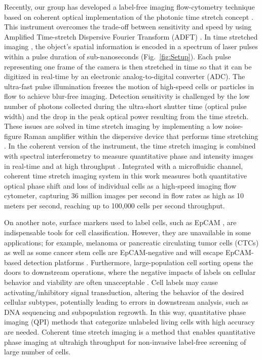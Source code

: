 \documentclass[aps,pra,reprint,longbibliography,superscriptaddress]{revtex4-1}
\begin{document}
Recently, our group has developed a label-free imaging flow-cytometry technique based on coherent optical implementation of the photonic time stretch concept \cite{mahjoubfar2013label}. This instrument overcomes the trade-off between sensitivity and speed by using Amplified Time-stretch Dispersive Fourier Transform (ADFT) \cite{goda2013dispersive, solli2009optical, goda2009theory}. In time stretched imaging \cite{goda2009serial}, the object's spatial information is encoded in a spectrum of laser pulses within a pulse duration of sub-nanoseconds (Fig.~\ref{fig:Setup}). Each pulse representing one frame of the camera is then stretched in time so that it can be digitized in real-time by an electronic analog-to-digital converter (ADC). The ultra-fast pulse illumination freezes the motion of high-speed cells or particles in flow to achieve blur-free imaging. Detection sensitivity is challenged by the low number of photons collected during the ultra-short shutter time (optical pulse width) and the drop in the peak optical power resulting from the time stretch. These issues are solved in time stretch imaging by implementing a low noise-figure Raman amplifier within the dispersive device that performs time stretching \cite{goda2009serial,mahjoubfar2013label,mahjoubfar2013optically}. In the coherent version of the instrument, the time stretch imaging is combined with spectral interferometry to measure quantitative phase and intensity images in real-time and at high throughput \cite{mahjoubfar2014label}. Integrated with a microfluidic channel, coherent time stretch imaging system in this work measures both quantitative optical phase shift and loss of individual cells as a high-speed imaging flow cytometer, capturing 36 million images per second in flow rates as high as 10 meters per second, reaching up to 100,000 cells per second throughput.

On another note, surface markers used to label cells, such as EpCAM \cite{gires2009abundance}, are indispensable tools for cell classification. However, they are unavailable in some applications; for example, melanoma or pancreatic circulating tumor cells (CTCs) as well as some cancer stem cells are EpCAM-negative and will escape EpCAM-based detection platforms \cite{kling2012beyond}. Furthermore, large-population cell sorting opens the doors to downstream operations, where the negative impacts of labels on cellular behavior and viability are often unacceptable \cite{boddington2011labeling}. Cell labels may cause activating/inhibitory signal transduction, altering the behavior of the desired cellular subtypes, potentially leading to errors in downstream analysis, such as DNA sequencing and subpopulation regrowth. In this way, quantitative phase imaging (QPI) methods \cite{ikeda2005hilbert,popescu2011quantitative,pham2013real} that categorize unlabeled living cells with high accuracy are needed. Coherent time stretch imaging is a method that enables quantitative phase imaging at ultrahigh throughput for non-invasive label-free screening of large number of cells.
\end{document}
